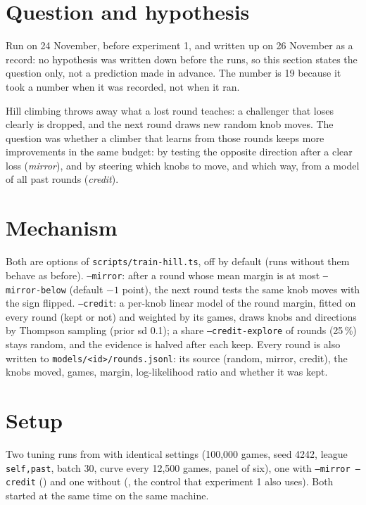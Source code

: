 \documentclass{../polyexp}
\begin{document}

\ExpHeader

\section{Question and hypothesis}
Run on 24 November, before experiment 1, and written up on 26 November as a record: no hypothesis was written down before the runs, so this section states the question only, not a prediction made in advance. The number is 19 because it took a number when it was recorded, not when it ran.

Hill climbing throws away what a lost round teaches: a challenger that loses clearly is dropped, and the next round draws new random knob moves. The question was whether a climber that learns from those rounds keeps more improvements in the same budget: by testing the opposite direction after a clear loss (\emph{mirror}), and by steering which knobs to move, and which way, from a model of all past rounds (\emph{credit}).

\section{Mechanism}
Both are options of \texttt{scripts/train-hill.ts}, off by default (runs without them behave as before).
\texttt{--mirror}: after a round whose mean margin is at most \texttt{--mirror-below} (default $-1$ point), the next round tests the same knob moves with the sign flipped.
\texttt{--credit}: a per-knob linear model of the round margin, fitted on every round (kept or not) and weighted by its games, draws knobs and directions by Thompson sampling (prior sd 0.1); a share \texttt{--credit-explore} of rounds (25\,\%) stays random, and the evidence is halved after each keep.
Every round is also written to \texttt{models/<id>/rounds.jsonl}: its source (random, mirror, credit), the knobs moved, games, margin, log-likelihood ratio and whether it was kept.

\section{Setup}
Two tuning runs from  with identical settings (100,000 games, seed 4242, league \texttt{self,past}, batch 30, curve every 12,500 games, panel of six), one with \texttt{--mirror --credit} () and one without (, the control that experiment 1 also uses). Both started at the same time on the same machine.
\end{document}
